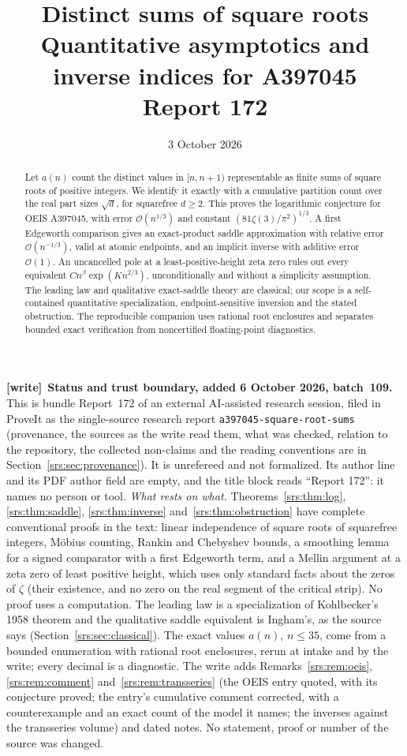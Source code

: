\documentclass[11pt]{article}
\title{\textbf{Distinct sums of square roots}\\[0.5em]
\large Quantitative asymptotics and inverse indices for A397045\\[0.6em]\normalsize Report 172}
\author{}
\date{3 October 2026}
\numberwithin{equation}{section}
\theoremstyle{remark}\newtheorem{remark}[theorem]{Remark}
\newcommand{\Oh}{\mathcal O}
\newcommand{\file}[1]{\nolinkurl{#1}}
\newenvironment{writenote}[1][]{\par\smallskip\begingroup\small
 \noindent\textbf{[write]}\if\relax\detokenize{#1}\relax\else~\textbf{#1.}\fi\ }%
 {\par\endgroup\smallskip}
\begin{document}
\maketitle
\begin{abstract}
Let $a(n)$ count the distinct values in $[n,n+1)$ representable as finite sums of square roots of positive integers. We identify it exactly with a cumulative partition count over the real part sizes $\sqrt d$, for squarefree $d\ge2$. This proves the logarithmic conjecture for OEIS A397045, with error $\Oh(n^{1/3})$ and constant $(81\zeta(3)/\pi^2)^{1/3}$. A first Edgeworth comparison gives an exact-product saddle approximation with relative error $\Oh(n^{-1/3})$, valid at atomic endpoints, and an implicit inverse with additive error $\Oh(1)$. An uncancelled pole at a least-positive-height zeta zero rules out every equivalent $C n^\beta\exp(Kn^{2/3})$, unconditionally and without a simplicity assumption. The leading law and qualitative exact-saddle theory are classical; our scope is a self-contained quantitative specialization, endpoint-sensitive inversion and the stated obstruction. The reproducible companion uses rational root enclosures and separates bounded exact verification from noncertified floating-point diagnostics.
\end{abstract}
\begin{writenote}[Status and trust boundary, added 6 October 2026, batch~109]
This is bundle Report~172 of an external AI-assisted research session, filed
in ProveIt as the single-source research report
\file{a397045-square-root-sums} (provenance, the sources as the write read
them, what was checked, relation to the repository, the collected non-claims
and the reading conventions are in Section~\ref{srs:sec:provenance}). It is
unrefereed and not formalized. Its author line and its PDF author field are
empty, and the title block reads ``Report 172'': it names no person or tool.
\emph{What rests on what.} Theorems~\ref{srs:thm:log}, \ref{srs:thm:saddle},
\ref{srs:thm:inverse} and~\ref{srs:thm:obstruction} have complete
conventional proofs in the text: linear independence of square roots of
squarefree integers, M\"obius counting, Rankin and Chebyshev bounds, a
smoothing lemma for a signed comparator with a first Edgeworth term, and a
Mellin argument at a zeta zero of least positive height, which uses only
standard facts about the zeros of $\zeta$ (their existence, and no zero on
the real segment of the critical strip). No proof uses a computation. The
leading law is a specialization of Kohlbecker's 1958 theorem and the
qualitative saddle equivalent is Ingham's, as the source says
(Section~\ref{srs:sec:classical}). The exact values $a(n)$, $n\le35$, come
from a bounded enumeration with rational root enclosures, rerun at intake
and by the write; every decimal is a diagnostic. The write adds
Remarks~\ref{srs:rem:oeis}, \ref{srs:rem:comment}
and~\ref{srs:rem:transseries} (the OEIS entry quoted, with its conjecture
proved; the entry's cumulative comment corrected, with a counterexample and
an exact count of the model it names; the inverses against the transseries
volume) and dated notes. No statement, proof or number of the source was
changed.
\end{writenote}
\end{document}
